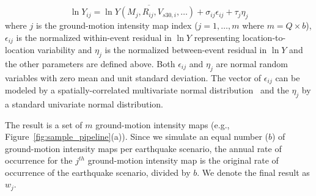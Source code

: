 \begin{equation}
\ln Y_{ij} = \overline{\ln Y (M_j, R_{ij}, V_{s30,i}, \ldots) }+ \sigma_{ij} \epsilon_{ij} + \tau_j \eta_j
\label{eq:GMPE}
\end{equation}
where $j$ is the ground-motion intensity map index ($j = 1, \ldots, m$ where $m = Q \times b$), $\epsilon_{ij}$ is the normalized within-event residual in $\ln Y$ representing location-to-location variability and $\eta_j$ is the normalized between-event residual in $\ln Y$ and the other parameters are defined above. Both $\epsilon_{ij}$ and $\eta_j$ are normal random variables with zero mean and unit standard deviation. The vector of $\epsilon_{ij}$ can be modeled by a spatially-correlated multivariate normal distribution~\cite[e.g.,][]{jayaram_correlation_2009} %
and the $\eta_j$ by a standard univariate normal distribution. 

The result is a set of $m$ ground-motion intensity maps (e.g., Figure~\ref{fig:sample_pipeline}{\color{red}(a)}). Since we simulate an equal number ($b$) of ground-motion intensity maps per earthquake scenario, the annual rate of occurrence for the $j^{th}$ ground-motion intensity map is the original rate of occurrence of the earthquake scenario, divided by $b$. We denote the final result as $w_j$.  

%

